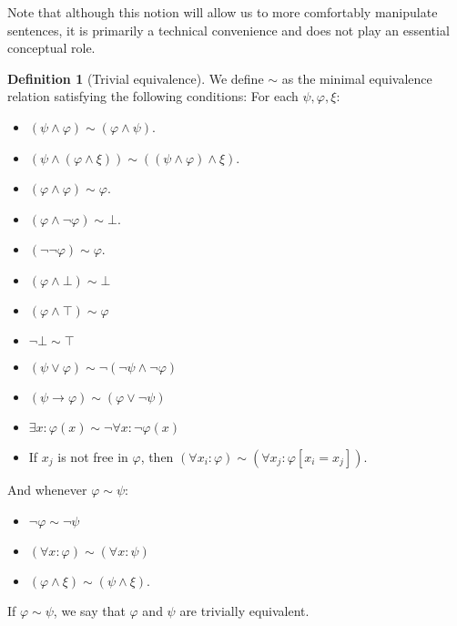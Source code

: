 \documentclass[12pt]{article}
\theoremstyle{definition}
\newtheorem{definition}{Definition}
\newcommand{\of}[1]{\left(#1\right)}
\newcommand{\vp}{\varphi}
\begin{document}
Note that although this notion will allow us to more comfortably
manipulate sentences, it is primarily a technical convenience
and does not play an essential conceptual role.

\begin{definition}[Trivial equivalence]
We define $\sim$ as the minimal
equivalence relation satisfying the following conditions:
For each $\psi, \vp, \xi$:
\begin{multicols}{2}
\begin{itemize}[label=]
\item $\of{\psi \wedge \vp} \sim \of{\vp \wedge \psi}$.
\item $\of{\psi \wedge \of{\vp \wedge \xi}} \sim \of{\of{\psi \wedge \vp} \wedge \xi}$.
\item $\of{\vp \wedge \vp} \sim \vp$.
\item $\of{\vp \wedge \neg \vp} \sim \bot$.
\item $\of{\neg \neg \vp} \sim \vp$.

\item $\of{\vp \wedge \bot} \sim \bot$
\item $\of{\vp \wedge \top} \sim \vp$
\item $\neg \bot \sim \top$
\item $\of{\psi \vee \vp} \sim \neg \of{\neg \psi \wedge \neg \vp}$
\item $\of{\psi \rightarrow \vp} \sim \of{ \vp \vee \neg \psi }$
\item $\exists x : \vp\of{x} \sim \neg \forall x : \neg \vp\of{x}$

\end{itemize}
\end{multicols}
\begin{itemize}[label=]
\item If $x_j$ is not free in $\vp$, then $\of{\forall x_i : \vp} \sim \of{\forall x_j : \vp\left[x_i = x_j\right]}$.
\end{itemize}
And whenever $\vp \sim \psi$:
\begin{multicols}{3}
\begin{itemize}[label=]
\item $\neg \vp \sim \neg \psi$
\item $\of{\forall x : \vp} \sim \of{\forall x : \psi}$
\item $\of{\vp \wedge \xi} \sim \of{\psi \wedge \xi}$.
\end{itemize}
\end{multicols}
If $\vp \sim \psi$, we say that $\vp$ and $\psi$ are trivially equivalent.
\end{definition}
\end{document}
